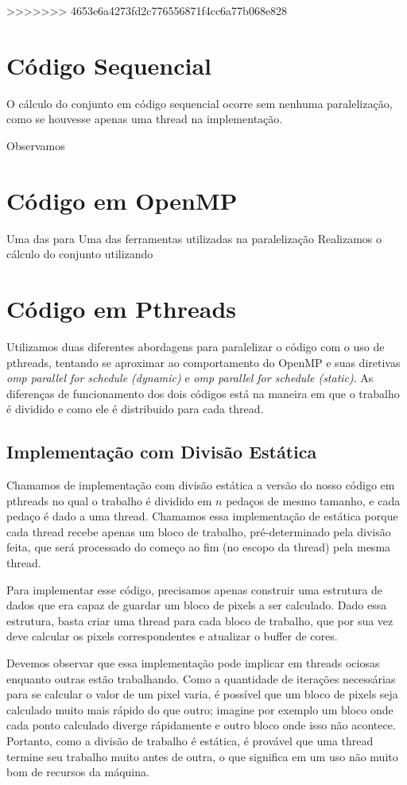 \documentclass[12pt]{article}
\begin{document}
>>>>>>> 4653e6a4273fd2c776556871f4cc6a77b068e828
\section{Código Sequencial}
O cálculo do conjunto em código sequencial ocorre sem nenhuma paralelização, como se houvesse apenas uma thread na implementação.

Observamos 
\newpage

\newpage
\section{Código em OpenMP}
Uma das para
Uma das ferramentas utilizadas na paralelização 
Realizamos o cálculo do conjunto utilizando 
\newpage

\newpage
\section{Código em Pthreads}
Utilizamos duas diferentes abordagens para paralelizar o código com
o uso de pthreads, tentando se aproximar ao comportamento do OpenMP e 
suas diretivas {\em omp parallel for schedule (dynamic)} e {\em omp 
parallel for schedule (static)}. As diferenças de funcionamento dos 
dois códigos está na maneira em que o trabalho é dividido e como ele é
distribuido para cada thread.

\subsection{Implementação com Divisão Estática}
Chamamos de implementação com divisão estática a versão do nosso 
código em pthreads no qual o trabalho é dividido em $n$ pedaços de mesmo 
tamanho, e cada pedaço é dado a uma thread. Chamamos essa implementação
de estática porque cada thread recebe apenas um bloco de trabalho,
pré-determinado pela divisão feita, que será processado do começo ao
fim (no escopo da thread) pela mesma thread.

Para implementar esse código, precisamos apenas construir uma estrutura
de dados que era capaz de guardar um bloco de pixels a ser calculado.
Dado essa estrutura, basta criar uma thread para cada bloco de trabalho,
que por sua vez deve calcular os pixels correspondentes e atualizar o 
buffer de cores.

Devemos observar que essa implementação pode implicar em threads ociosas
enquanto outras estão trabalhando. Como a quantidade de iterações
necessárias para se calcular o valor de um pixel varia, é possível que
um bloco de pixels seja calculado muito mais rápido do que outro; 
imagine por exemplo um bloco onde cada ponto calculado diverge 
rápidamente e outro bloco onde isso não acontece. Portanto, como a 
divisão de trabalho é estática, é provável que uma thread termine seu
trabalho muito antes de outra, o que significa em um uso não muito bom
de recursos da máquina.
\end{document}

